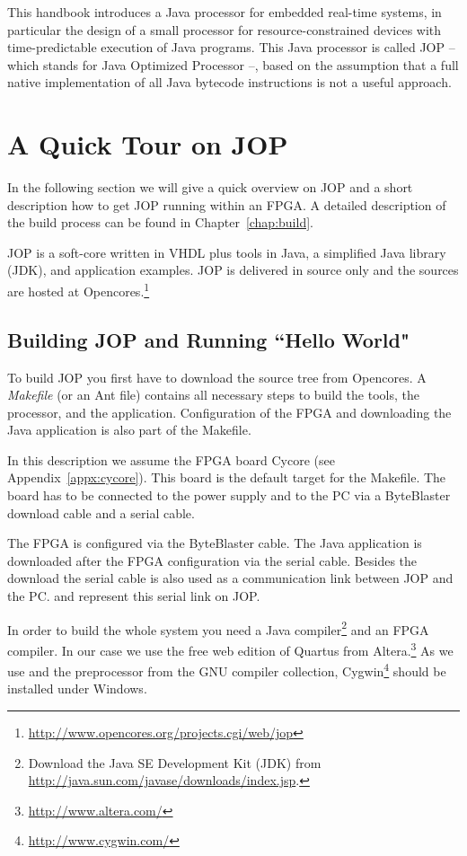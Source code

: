 

This handbook introduces a Java processor for embedded real-time
systems, in particular the design of a small processor for
resource-constrained devices with time-predictable execution of Java
programs. This Java processor is called JOP -- which stands for Java
Optimized Processor --, based on the assumption that a full native
implementation of all Java bytecode instructions is not a useful
approach.

\section{A Quick Tour on JOP}

In the following section we will give a quick overview on JOP and a
short description how to get JOP running within an FPGA. A detailed
description of the build process can be found in
Chapter~\ref{chap:build}.

JOP is a soft-core written in VHDL plus tools in Java, a simplified
Java library (JDK), and application examples. JOP is delivered in
source only and the sources are hosted at
Opencores.\footnote{\url{http://www.opencores.org/projects.cgi/web/jop}}


\subsection{Building JOP and Running ``Hello World"}

To build JOP you first have to download the source tree from
Opencores. A \emph{Makefile} (or an Ant file) contains all necessary
steps to build the tools, the processor, and the application.
Configuration of the FPGA and downloading the Java application is
also part of the Makefile.

In this description we assume the FPGA board Cycore (see
Appendix~\ref{appx:cycore}). This board is the default target for
the Makefile. The board has to be connected to the power supply and
to the PC via a ByteBlaster download cable and a serial cable.

The FPGA is configured via the ByteBlaster cable. The Java
application is downloaded after the FPGA configuration via the serial
cable. Besides the download the serial cable is also used as a
communication link between JOP and the PC.  and
 represent this serial link on JOP.

In order to build the whole system you need a Java
compiler\footnote{Download the Java SE Development Kit (JDK) from
\url{http://java.sun.com/javase/downloads/index.jsp}.} and an FPGA
compiler. In our case we use the free web edition of Quartus from
Altera.\footnote{\url{http://www.altera.com/}} As we use 
and the preprocessor from the GNU compiler collection,
Cygwin\footnote{\url{http://www.cygwin.com/}} should be installed
under Windows.

